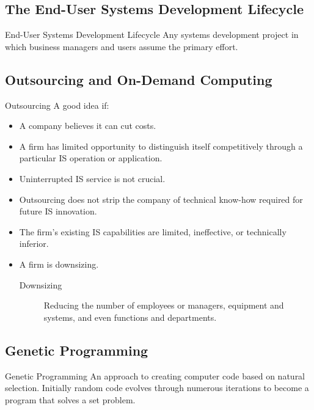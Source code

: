 \documentclass[\main/notes.tex]{subfiles}
\begin{document}
			\subsection{The End-User Systems Development Lifecycle}
				\begin{definition}{End-User Systems Development Lifecycle}
					Any systems development project in which business managers and users assume the primary effort.
				\end{definition}
			\subsection{Outsourcing and On-Demand Computing}
				\begin{sidenote}{Outsourcing}
					A good idea if:
					\begin{itemize}[nosep]
						\item A company believes it can cut costs.
						\item A firm has limited opportunity to distinguish itself competitively through a particular IS operation or application.
						\item Uninterrupted IS service is not crucial.
						\item Outsourcing does not strip the company of technical know-how required for future IS innovation.
						\item The firm's existing IS capabilities are limited, ineffective, or technically inferior.
						\item A firm is downsizing.
							\begin{description}
								\item[Downsizing] Reducing the number of employees or managers, equipment and systems, and even functions and departments. 
							\end{description}
					\end{itemize}
				\end{sidenote}
			\subsection{Genetic Programming}
				\begin{definition}{Genetic Programming}
					An approach to creating computer code based on natural selection. Initially random code evolves through numerous iterations to become a program that solves a set problem.
				\end{definition}

	\vbox{}
\end{document}
